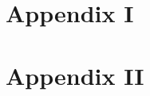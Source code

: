 \chapter{Appendix I}
\label{sec:appendix}
\blindtext[3]

\chapter{Appendix II}
\label{sec:appendix2}
\blindtext[3]